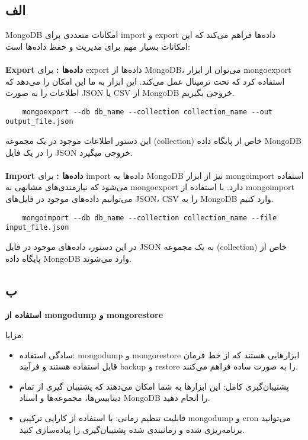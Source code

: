 \subsection*{الف}
MongoDB امکانات متعددی برای import و export داده‌ها فراهم می‌کند که این امکانات بسیار مهم برای مدیریت و حفظ داده‌ها است:
\\
\\
\textbf{Export داده‌ها 
	:
}
برای export داده‌ها از MongoDB، می‌توان از ابزار mongoexport استفاده کرد که تحت ترمینال عمل می‌کند. این ابزار به ما این امکان را می‌دهد که اطلاعات را به صورت JSON یا CSV از MongoDB خروجی بگیریم.

\setLTR
\begin{lstlisting}
	mongoexport --db db_name --collection collection_name --out output_file.json
\end{lstlisting}
\setRTL

این دستور اطلاعات موجود در یک مجموعه (collection) خاص از پایگاه داده MongoDB را در یک فایل JSON خروجی میگیرد.
\\
\\
\textbf{Import داده‌ها 
	:
}
برای import داده‌ها به MongoDB نیز از ابزار mongoimport استفاده می‌شود که نیازمندی‌های مشابهی به mongoexport دارد. با استفاده از mongoimport می‌توانیم داده‌های موجود در فایل‌های JSON، CSV را به MongoDB وارد کنیم. 

\setLTR
\begin{lstlisting}
	mongoimport --db db_name --collection collection_name --file input_file.json
\end{lstlisting}
\setRTL

در این دستور، داده‌های موجود در فایل JSON به یک مجموعه (collection) خاص از پایگاه داده MongoDB وارد می‌شوند.


\subsection*{ب}

\textbf{
استفاده از mongodump و mongorestore}

مزایا:
\begin{itemize}
	\item سادگی استفاده: mongodump و mongorestore ابزارهایی هستند که از خط فرمان قابل استفاده هستند و فرآیند backup و restore را به صورت ساده فراهم می‌کنند.

	\item پشتیبان‌گیری کامل: این ابزارها به شما امکان می‌دهند که پشتیبان گیری از تمام دیتابیس‌ها، مجموعه‌ها و اسناد MongoDB را انجام دهید.

	\item قابلیت تنظیم زمانی: با استفاده از کارایی ترکیبی mongodump و cron می‌توانید برنامه‌ریزی شده و زمانبندی شده پشتیبان‌گیری را پیاده‌سازی کنید.
\end{itemize}

